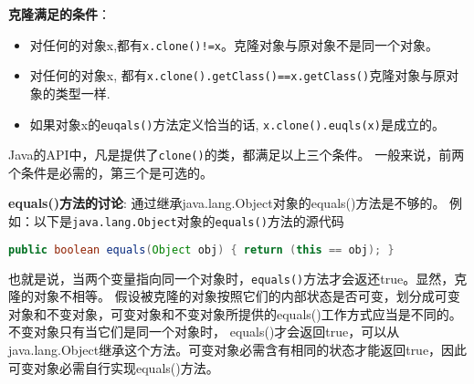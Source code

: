 \documentclass[../main.tex]{subfiles}
\begin{document}
\textbf{克隆满足的条件}：
\begin{itemize}
  \item 对任何的对象x,都有\texttt{x.clone()!=x}。克隆对象与原对象不是同一个对象。
  \item 对任何的对象x,
    都有\texttt{x.clone().getClass()==x.getClass()}克隆对象与原对象的类型一样.
  \item 如果对象x的\texttt{euqals()}方法定义恰当的话,
    \texttt{x.clone().euqls(x)}是成立的。
\end{itemize}
Java的API中，凡是提供了\texttt{clone()}的类，都满足以上三个条件。
一般来说，前两个条件是必需的，第三个是可选的。

\textbf{equals()方法的讨论}:
通过继承java.lang.Object对象的equals()方法是不够的。
例如：以下是\texttt{java.lang.Object}对象的\texttt{equals()}方法的源代码
\begin{lstlisting}[language=java]
public boolean equals(Object obj) { return (this == obj); }
\end{lstlisting}
也就是说，当两个变量指向同一个对象时，\texttt{equals()}方法才会返还true。显然，克隆的对象不相等。
假设被克隆的对象按照它们的内部状态是否可变，划分成可变对象和不变对象，可变对象和不变对象所提供的equals()工作方式应当是不同的。
不变对象只有当它们是同一个对象时， equals()才会返回true，可以从java.lang.Object继承这个方法。可变对象必需含有相同的状态才能返回true，因此可变对象必需自行实现equals()方法。
%
\end{document}
